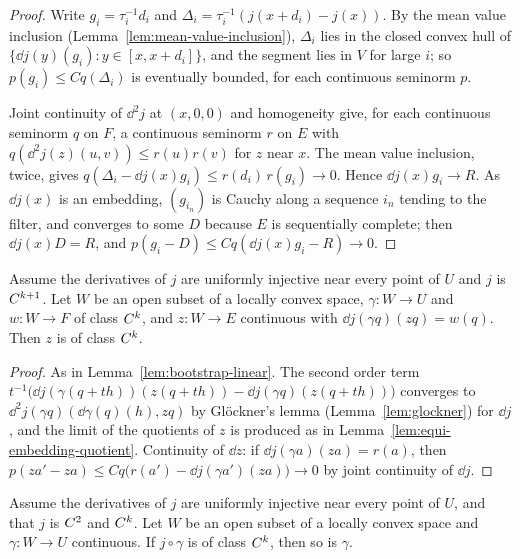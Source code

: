\begin{proof}
  \leanok
  Write $g_i = \tau_i^{-1} d_i$ and $\Delta_i = \tau_i^{-1}(j(x + d_i) - j(x))$. By the mean
  value inclusion (Lemma~\ref{lem:mean-value-inclusion}), $\Delta_i$ lies in the closed convex
  hull of $\{\dd j(y)(g_i) : y \in [x, x + d_i]\}$, and the segment lies in $V$ for large $i$; so
  $p(g_i) \le C q(\Delta_i)$ is eventually bounded, for each continuous seminorm $p$.

  Joint continuity of $\dd^2 j$ at $(x, 0, 0)$ and homogeneity give, for each continuous
  seminorm $q$ on $F$, a continuous seminorm $r$ on $E$ with
  $q(\dd^2 j(z)(u, v)) \le r(u) r(v)$ for $z$ near $x$. The mean value inclusion, twice, gives
  $q(\Delta_i - \dd j(x) g_i) \le r(d_i)\, r(g_i) \to 0$. Hence $\dd j(x) g_i \to R$. As
  $\dd j(x)$ is an embedding, $(g_{i_n})$ is Cauchy along a sequence $i_n$ tending to the filter,
  and converges to some $D$ because $E$ is sequentially complete; then $\dd j(x) D = R$, and
  $p(g_i - D) \le C q(\dd j(x) g_i - R) \to 0$.
\end{proof}

\begin{lemma}
  \label{lem:bootstrap-linear-lc}
  \leanok
  Assume the derivatives of $j$ are uniformly injective near every point of $U$ and $j$ is
  $C^{k+1}$. Let $W$ be an open subset of a locally convex space, $\gamma \colon W \to U$ and
  $w \colon W \to F$ of class $C^{k}$, and $z \colon W \to E$ continuous with
  $\dd j(\gamma q)(z q) = w(q)$. Then $z$ is of class $C^{k}$.
\end{lemma}

\begin{proof}
  \leanok
  As in Lemma~\ref{lem:bootstrap-linear}. The second order term
  $t^{-1}\bigl(\dd j(\gamma(q + th))(z(q+th)) - \dd j(\gamma q)(z(q + th))\bigr)$ converges to
  $\dd^2 j(\gamma q)(\dd\gamma(q)(h), z q)$ by Glöckner's lemma (Lemma~\ref{lem:glockner}) for
  $\dd j$, and the limit of the quotients of $z$ is produced as in
  Lemma~\ref{lem:equi-embedding-quotient}. Continuity of $\dd z$: if
  $\dd j(\gamma a)(z a) = r(a)$, then
  $p(z a' - z a) \le C q\bigl(r(a') - \dd j(\gamma a')(z a)\bigr) \to 0$ by joint continuity
  of $\dd j$.
\end{proof}

\begin{theorem}
  \label{thm:equi-embedding}
  \leanok
  Assume the derivatives of $j$ are uniformly injective near every point of $U$, and that $j$ is
  $C^{2}$ and $C^{k}$. Let $W$ be an open subset of a locally convex space and
  $\gamma \colon W \to U$ continuous. If $j \circ \gamma$ is of class $C^{k}$, then so is
  $\gamma$.
\end{theorem}

